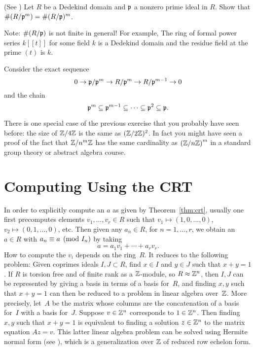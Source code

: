 \begin{exercise}\label{ex:residuefieldofpower}(See \cite[Thm.~22(a)]{marcus1977number}) %
	Let $R$ be a Dedekind domain and $\mathfrak{p}$ a nonzero prime ideal in $R$.
	Show that $\#(R/\mathfrak{p}^m) = \#(R/\mathfrak{p})^m$.
	
	Note: $\#(R/\mathfrak{p})$ is not finite in general! For example,
	The ring of formal power series $k[[t]]$ for some field $k$
	is a Dedekind domain and the residue field at the prime $(t)$
	is $k$.
	
	\begin{hint}
		Consider the exact sequence
		$$
			0\to \mathfrak{p}/\mathfrak{p}^{m} \to R/\mathfrak{p}^{m} \to R/\mathfrak{p}^{m-1} \to 0
		$$
		and the chain
		$$
			\mathfrak{p}^m \subseteq \mathfrak{p}^{m-1}
			\subseteq \cdots \subseteq \mathfrak{p}^2 \subseteq \mathfrak{p}.
		$$
	\end{hint}
\end{exercise}

\begin{remark}
	There is one special case of the previous exercise that you probably
	have seen before: the size of $\mathbb{Z}/4\mathbb{Z}$ is the same as
	$(\mathbb{Z}/2\mathbb{Z})^2$. In fact you might have seen a proof of
	the fact that $\mathbb{Z}/n^m\mathbb{Z}$ has the same cardinality as $\left(\mathbb{Z}/n\mathbb{Z}\right)^m$
	in a standard group theory or abstract algebra course.
\end{remark}

\section{Computing Using the CRT}
In order to explicitly compute an $a$ as given by Theorem~\ref{thm:crt},
usually one first precomputes elements $v_1, \ldots, v_r \in R$ such that
$v_1\mapsto (1,0,\ldots, 0)$, 
$v_2\mapsto (0,1,\ldots, 0)$, etc.
Then given any $a_n \in R$, for $n=1,\ldots, r$, we obtain an $a \in R$
with $a_n\equiv a\pmod{I_n}$ by taking
$$
  a = a_1 v_1 + \cdots + a_r v_r.
$$
How to compute the $v_i$ depends on the ring~$R$.   It reduces to
the following problem: Given coprimes ideals $I,J\subset R$, find
$x\in I$ and $y\in J$ such that $x+y=1$.   If $R$ is torsion free and
of finite rank 
as a $\mathbb{Z}$-module, so $R\approx \mathbb{Z}^n$,
then $I, J$ can be represented by giving a basis in terms of a basis
for~$R$, and finding $x,y$ such  that $x+y=1$ can then be reduced to 
a problem in linear algebra over~$\mathbb{Z}$.  
More precisely, let~$A$
be the matrix whose columns are the concatenation of a basis for~$I$
with a basis for~$J$.  
Suppose $v\in \mathbb{Z}^n$ corresponds to $1\in\mathbb{Z}^n$.
Then finding $x,y$ such that $x+y=1$ is equivalent to
finding a solution $z\in \mathbb{Z}^n$ to the matrix equation
$Az = v$. This latter linear algebra problem
can be solved using Hermite normal form 
(see \cite[\S4.7.1]{cohen:course_ant}),
which is a generalization over $\mathbb{Z}$
of reduced row echelon form.

